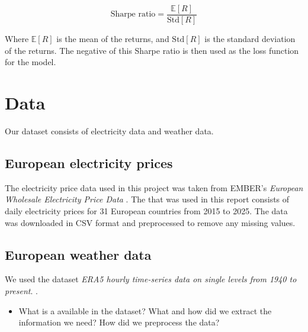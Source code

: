\documentclass[12pt]{article}
\begin{document}
\begin{equation}
    \text{Sharpe ratio} = \frac{\mathbb{E}[R]}{\text{Std}[R]}    
    \label{eq:sharpe_ratio}
\end{equation}

Where $\mathbb{E}[R]$ is the mean of the returns, and $\text{Std}[R]$ is the standard deviation of the returns. The negative of this Sharpe ratio is then used as the loss function for the model.

\clearpage






\section{Data}

Our dataset consists of electricity data and weather data.

\subsection{European electricity prices}

The electricity price data used in this project was taken from EMBER's \textit{European Wholesale Electricity Price Data} \citep{ember2025}.  The that was used in this report consists of daily electricity prices for 31 European countries from 2015 to 2025. The data was downloaded in CSV format and preprocessed to remove any missing values.

\subsection{European weather data}
We used the dataset \textit{ERA5 hourly time-series data on single levels from 1940 to present}. \citep{hersbach2025era5}. 

\begin{itemize}
    \item What is a available in the dataset? What and how did we extract the information we need? How did we preprocess the data?
\end{itemize}

 \clearpage



\end{document}
